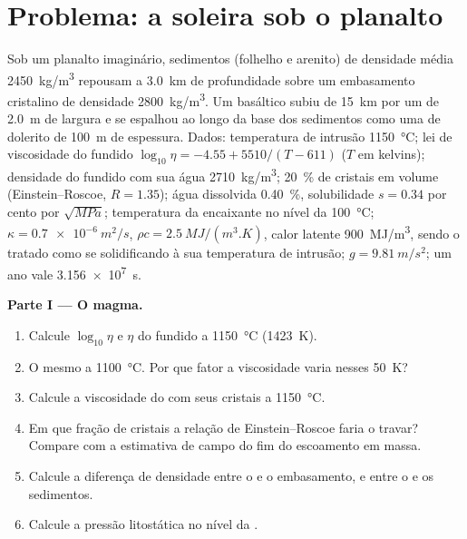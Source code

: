 \section{Problema: a soleira sob o planalto}

\begin{problem}
\label{pb:b2:magma-emplacement:1}
Sob um planalto imaginário, sedimentos (folhelho e arenito) de densidade média
\qty{2450}{kg/m^3} repousam a \qty{3.0}{km} de profundidade sobre um embasamento cristalino de
densidade \qty{2800}{kg/m^3}. Um  basáltico subiu de \qty{15}{km} por um 
de \qty{2.0}{m} de largura e se espalhou ao longo da base dos sedimentos como uma  de dolerito
de \qty{100}{m} de espessura. Dados: temperatura de intrusão \qty{1150}{\celsius}; lei de
viscosidade do fundido $\log_{10}\eta = -4.55 + 5510/(T - 611)$ ($T$ em kelvins); densidade
do fundido com sua água \qty{2710}{kg/m^3}; \qty{20}{\percent} de cristais em volume
(Einstein--Roscoe, $R = 1.35$); água dissolvida \qty{0.40}{\percent}, solubilidade
$s = 0.34$ por cento por $\sqrt{\unit{MPa}}$; temperatura da encaixante no nível da 
\qty{100}{\celsius}; $\kappa = \qty{0.7e-6}{m^2/s}$, $\rho c = \qty{2.5}{MJ/(m^3.K)}$,
calor latente \qty{900}{MJ/m^3}, sendo o  tratado como se solidificando à sua
temperatura de intrusão; $g = \qty{9.81}{m/s^2}$; um ano vale \qty{3.156e7}{s}.

\medskip\noindent\textbf{Parte I --- O magma.}
\begin{enumerate}
\item Calcule $\log_{10}\eta$ e $\eta$ do fundido a \qty{1150}{\celsius}
(\qty{1423}{K}).
\item O mesmo a \qty{1100}{\celsius}. Por que fator a viscosidade varia nesses
\qty{50}{K}?
\item Calcule a viscosidade do  com seus cristais a
\qty{1150}{\celsius}.
\item Em que fração de cristais a relação de Einstein--Roscoe faria o
 travar? Compare com a estimativa de campo do fim do escoamento em massa.
\item Calcule a diferença de densidade entre o  e o embasamento, e
entre o  e os sedimentos.
\item Calcule a pressão litostática no nível da .
\end{enumerate}


\end{problem}
